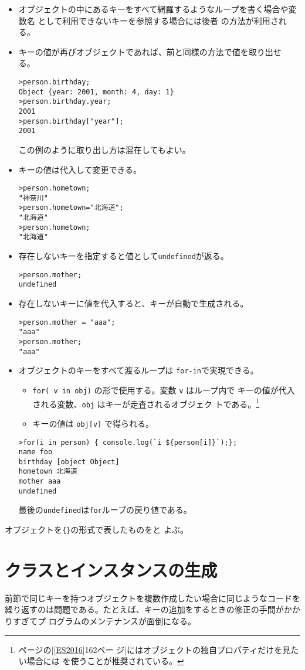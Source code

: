 \begin{Exec}
\begin{itemize}
 \item オブジェクトの中にあるキーをすべて網羅するようなループを書く場合や変数名
       として利用できないキーを参照する場合には後者
       の方法が利用される。
 \item キーの値が再びオブジェクトであれば、前と同様の方法で値を取り出せ
       る。
\begin{Verbatim}
>person.birthday;
Object {year: 2001, month: 4, day: 1}
>person.birthday.year;
2001
>person.birthday["year"];
2001
\end{Verbatim}
この例のように取り出し方は混在してもよい。
 \item キーの値は代入して変更できる。
\begin{Verbatim}
>person.hometown;
"神奈川"
>person.hometown="北海道";
"北海道"
>person.hometown;
"北海道"
\end{Verbatim}
 \item 存在しないキーを指定すると値として\verb+undefined+が返る。
\begin{Verbatim}
>person.mother;
undefined
\end{Verbatim}
 \item 存在しないキーに値を代入すると、キーが自動で生成される。
\begin{Verbatim}
>person.mother = "aaa";
"aaa"
>person.mother;
"aaa"
\end{Verbatim}
 \item オブジェクトのキーをすべて渡るループは \verb+for-in+で実現できる。
\begin{itemize}
 \item \verb+for( v in obj)+ の形で使用する。変数 \verb+v+ はループ内で
       キーの値が代入される変数、\verb+obj+ はキーが走査されるオブジェク
       トである。\footnote{\pageref{ES2016}ページの[\ref{ES2016}162ペー
       ジ]にはオブジェクトの独自プロパティだけを見たい場合には
       を使うことが推奨されている。}
 \item キーの値は \verb+obj[v]+ で得られる。
\end{itemize}
\begin{Verbatim}
>for(i in person) { console.log(`i ${person[i]}`);};
name foo
birthday [object Object]
hometown 北海道
mother aaa
undefined
\end{Verbatim}
最後の\verb+undefined+は\verb+for+ループの戻り値である。
\end{itemize}
\end{Exec}
オブジェクトを\verb+{}+の形式で表したものをと
よぶ。
\section{クラスとインスタンスの生成}
前節で同じキーを持つオブジェクトを複数作成したい場合に同じようなコードを
繰り返すのは問題である。たとえば、キーの追加をするときの修正の手間がかかりすぎてプ
ログラムのメンテナンスが面倒になる。

